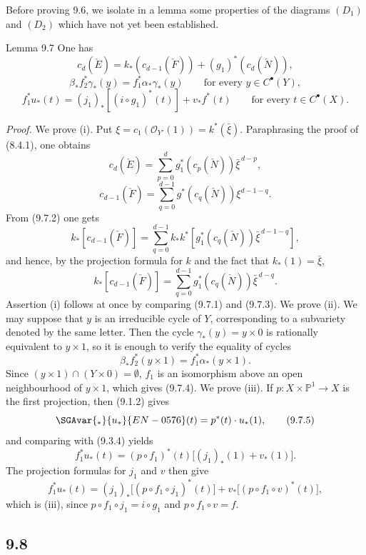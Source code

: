 Before proving 9.6, we isolate in a lemma some properties of the diagrams $(D_1)$ and $(D_2)$ which have not yet been established.

\begin{statement}{Lemma 9.7}
One has
\[
c_d(\check E)=k_*(c_{d-1}(\check F))+(g_1)^*(c_d(\check N)),
\tag{9.7 i}
\]
\[
\beta_*f_2^*\gamma_*(y)=f_1^*\alpha_*\gamma_*(y)\qquad\text{for every }y\in C^{\bullet}(Y),
\tag{9.7 ii}
\]
\[
f_1^*u_*(t)=(j_1)_*[(i\circ g_1)^*(t)]+v_*f^*(t)\qquad\text{for every }t\in C^{\bullet}(X).
\tag{9.7 iii}
\]
\end{statement}

\emph{Proof.} We prove (i). Put %
$\xi=c_1(\mathcal O_{Y'}(1))=k^*(\bar\xi)$. Paraphrasing the proof of (8.4.1), one obtains
\[
c_d(\check E)=\sum_{p=0}^d g_1^*(c_p(\check N))\bar\xi^{\,d-p},
\tag{9.7.1}
\]
\[
c_{d-1}(\check F)=\sum_{q=0}^{d-1}g^*(c_q(\check N))\xi^{d-1-q}.
\tag{9.7.2}
\]
From (9.7.2) one gets
\[
k_*[c_{d-1}(\check F)]
=\sum_{q=0}^{d-1}k_*k^*[g_1^*(c_q(\check N))\bar\xi^{\,d-1-q}],
\]
and hence, by the projection formula for $k$ and the fact that $k_*(1)=\bar\xi$,
\[
k_*[c_{d-1}(\check F)]=\sum_{q=0}^{d-1}g_1^*(c_q(\check N))\bar\xi^{\,d-q}.
\tag{9.7.3}
\]
Assertion (i) follows at once by comparing (9.7.1) and (9.7.3). We prove (ii). We may suppose that $y$ is an irreducible cycle of $Y$, corresponding to a subvariety denoted by the same letter. Then the cycle $\gamma_*(y)=y\times0$ is rationally equivalent to $y\times1$, so it is enough to verify the equality of cycles
\[
\beta_*f_2^*(y\times1)=f_1^*\alpha_*(y\times1).
\tag{9.7.4}
\]
Since $(y\times1)\cap(Y\times0)=\emptyset$, $f_1$ is an isomorphism above an open neighbourhood of $y\times1$, which gives (9.7.4). We prove (iii). If $p:X\times\mathbb P^1\to X$ is the first projection, then (9.1.2) gives
\[\SGAvar{
_*}{
u_*}{EN-0576}(t)=p^*(t)\cdot u_*(1),
\tag{9.7.5}
\]
and comparing with (9.3.4) yields
\[
f_1^*u_*(t)=(p\circ f_1)^*(t)\bigl[(j_1)_*(1)+v_*(1)\bigr].
\tag{9.7.6}
\]
The projection formulas for $j_1$ and $v$ then give
\[
f_1^*u_*(t)=(j_1)_*\bigl[(p\circ f_1\circ j_1)^*(t)\bigr]+v_*\bigl[(p\circ f_1\circ v)^*(t)\bigr],
\tag{9.7.7}
\]
which is (iii), since $p\circ f_1\circ j_1=i\circ g_1$ and $p\circ f_1\circ v=f$.

\subsection*{9.8}


